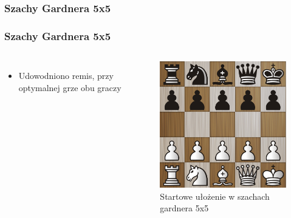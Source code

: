 \documentclass[polish,envcountsect,10pt]{beamer}
\begin{document}
            \subsubsection{Szachy Gardnera 5x5}
                \begin{frame}
                    \frametitle{Szachy Gardnera 5x5}
                    \begin{columns}
                        \begin{itemize}
                            \item Udowodniono remis, przy optymalnej grze obu graczy \cite{minichess}
                        \end{itemize}
                            \begin{figure}[H]
                                \centering
                                \includegraphics[width=\textwidth]{images/gardner.png}
                                \caption{Startowe ułożenie w szachach gardnera 5x5}
                            \end{figure}    
                    \end{columns}
                \end{frame}
\end{document}
